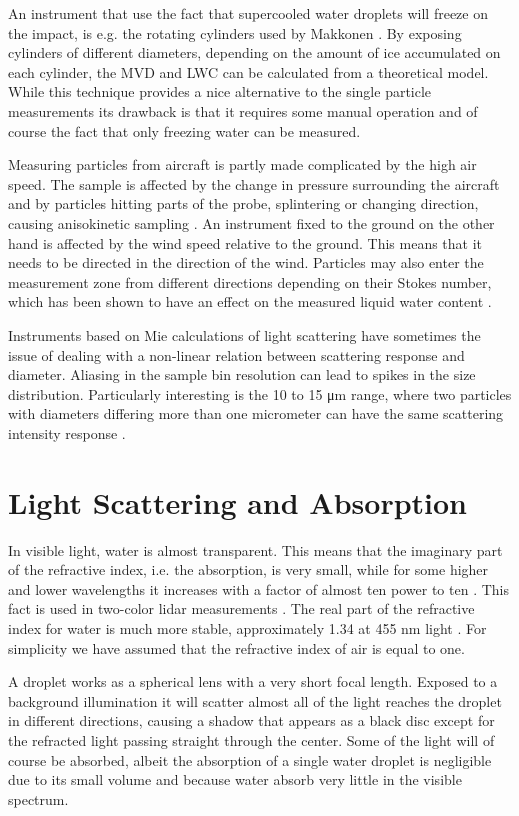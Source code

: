 An instrument that use the fact that supercooled water droplets will freeze on the impact, is e.g. the rotating cylinders used by Makkonen \cite{makk1992}. By exposing cylinders of different diameters, depending on the amount of ice accumulated on each cylinder, the MVD and LWC can be calculated from a theoretical model. While this technique provides a nice alternative to the single particle measurements its drawback is that it requires some manual operation and of course the fact that only freezing water can be measured.

Measuring particles from aircraft is partly made complicated by the high air speed. The sample is affected by the change in pressure surrounding the aircraft and by particles hitting parts of the probe, splintering or changing direction, causing anisokinetic sampling \cite{baum2011}. An instrument fixed to the ground on the other hand is affected by the wind speed relative to the ground. This means that it needs to be directed in the direction of the wind. Particles may also enter the measurement zone from different directions depending on their Stokes number, which has been shown to have an effect on the measured liquid water content \cite{henn2013}.

Instruments based on Mie calculations of light scattering have sometimes the issue of dealing with a non-linear relation between scattering response and diameter. Aliasing in the sample bin resolution can lead to spikes in the size distribution. Particularly interesting is the 10 to 15 μm range, where two particles with diameters differing more than one micrometer can have the same scattering intensity response \cite{dye1984,spie2012,bohr2008}.

\section{Light Scattering and Absorption}

In visible light, water is almost transparent. This means that the imaginary part of the refractive index, i.e. the absorption, is very small, while for some higher and lower wavelengths it increases with a factor of almost ten power to ten \cite{kou1993}. This fact is used in two-color lidar measurements \cite{west2010}. The real part of the refractive index for water is much more stable, approximately 1.34 at 455 nm light \cite{hale1973}. For simplicity we have assumed that the refractive index of air is equal to one. 

A droplet works as a spherical lens with a very short focal length. Exposed to a background illumination it will scatter almost all of the light reaches the droplet in different directions, causing a shadow that appears as a black disc except for the refracted light passing straight through the center. Some of the light will of course be absorbed, albeit the absorption of a single water droplet is negligible due to its small volume and because water absorb very little in the visible spectrum.

